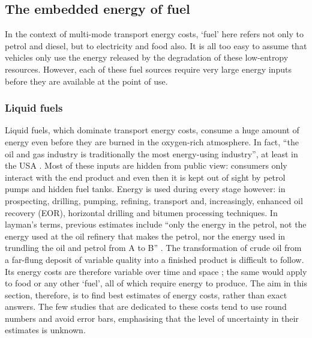 \subsection{The embedded energy of fuel} 
\label{sfuelem}
In the context of multi-mode transport energy costs, `fuel' here refers not
only to petrol and diesel, but to electricity and food also. It is all too easy
to assume that vehicles only use the energy released by the degradation of
these low-entropy resources. However, each of these fuel sources require very
large energy inputs before they are available at the point of use.

\subsubsection{Liquid fuels} 
Liquid fuels, which dominate transport energy costs, consume a huge amount of
energy even before they are burned in the oxygen-rich atmosphere. In fact,
``the oil and gas industry is traditionally the most energy-using industry'',
at least in the USA \citep{Guilford2011}. Most of these
inputs are hidden from public view: consumers only interact with the end
product and even then it is kept out of sight by petrol pumps and hidden fuel
tanks. Energy is used during every stage however: in prospecting, drilling,
pumping, refining, transport and, increasingly, enhanced oil recovery (EOR),
horizontal drilling and bitumen processing techniques. In layman's terms,
previous estimates include ``only the energy in the
petrol, not the energy used at the oil refinery that makes the petrol, nor the
energy used in trundling the oil and petrol from A to B''
\citep[p.~104]{MacKay2009}. The transformation of
crude oil from a far-flung deposit of variable quality into a finished product
is difficult to follow. Its energy costs are therefore variable over time and
space \citep{Cleveland2005}; the same would apply to food or any other `fuel',
all of which require energy to produce. The aim in this section, therefore, is
to find best estimates of energy costs, rather than exact answers. The
few studies that are dedicated to these costs tend to use round numbers and
avoid error bars, emphasising that the level of uncertainty in their estimates
is unknown.

